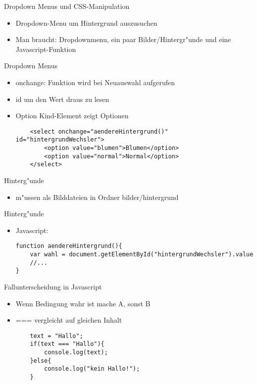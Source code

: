 \documentclass[18pt]{beamer}
\begin{document}
\begin{frame}[fragile]{Dropdown Menus und CSS-Manipulation}
\begin{itemize}
	\item Dropdown-Menu um Hintergrund auszusuchen
	\item Man braucht: Dropdownmenu, ein paar Bilder/Hintergr"unde und eine Javascript-Funktion 
\end{itemize}
\end{frame}

\begin{frame}[fragile]{Dropdown Menus}
\begin{itemize}
	\item onchange: Funktion wird bei Neuauswahl aufgerufen
	\item id um den Wert draus zu lesen
	\item Option Kind-Element zeigt Optionen

\begin{lstlisting}
	<select onchange="aendereHintergrund()"  id="hintergrundWechsler">
		<option value="blumen">Blumen</option>
		<option value="normal">Normal</option>
	</select>
\end{lstlisting}
\end{itemize}
\end{frame}

\begin{frame}[fragile]{Hinterg"unde}
\begin{itemize}
	\item m"ussen als Bilddateien in Ordner bilder/hintergrund
	
\end{itemize}
\end{frame}

\begin{frame}[fragile]{Hinterg"unde}
\begin{itemize}
	\item Javascript:
	\begin{lstlisting}
function aendereHintergrund(){
	var wahl = document.getElementById("hintergrundWechsler").value
	//...
}
	\end{lstlisting}
	
\end{itemize}
\end{frame}

\begin{frame}[fragile]{Fallunterscheidung in Javascript}
\begin{itemize}
	\item \glqq Wenn Bedingung wahr ist mache A, sonst B\grqq
	\item === vergleicht auf gleichen Inhalt
	\begin{lstlisting}
	text = "Hallo";
	if(text === "Hallo"){
		console.log(text);
	}else{
		console.log("kein Hallo!");
	}
	\end{lstlisting}
\end{itemize}
\end{frame}
\end{document}
